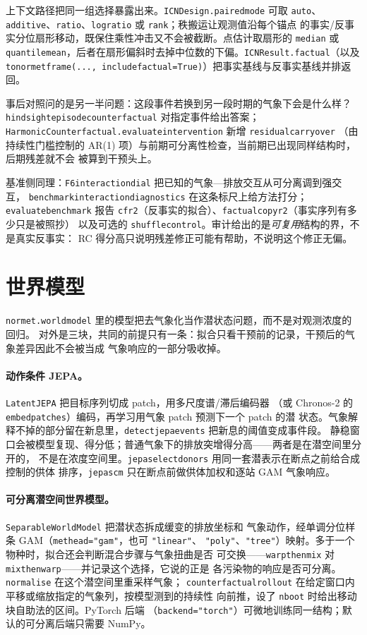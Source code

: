 \documentclass[11pt]{ctexrep}
\newcommand{\codeunderscore}{\textunderscore\allowbreak}
\newcommand{\code}[1]{\texttt{\let\_\codeunderscore #1}}
\begin{document}
上下文路径把同一组选择暴露出来。\code{ICNDesign.paired\_mode} 可取 \code{auto}、
\code{additive}、\code{ratio}、\code{log\_ratio} 或 \code{rank}；秩搬运让观测值沿每个锚点
的事实/反事实分位扇形移动，既保住乘性冲击又不会被截断。点估计取扇形的 \code{median} 或
\code{quantile\_mean}，后者在扇形偏斜时去掉中位数的下偏。\code{ICNResult.factual}（以及
\code{to\_normet\_frame(..., include\_factual=True)}）把事实基线与反事实基线并排返回。

事后对照问的是另一半问题：这段事件若换到另一段时期的气象下会是什么样？
\code{hindsight\_episode\_counterfactual} 对指定事件给出答案；
\code{HarmonicCounterfactual.evaluate\_intervention} 新增 \code{residual\_carryover}
（由持续性门槛控制的 AR(1) 项）与前期可分离性检查，当前期已出现同样结构时，后期残差就不会
被算到干预头上。

基准侧同理：\code{F6\_interaction\_dial} 把已知的气象—排放交互从可分离调到强交互，
\code{benchmark\_interaction\_diagnostics} 在这条标尺上给方法打分；\code{evaluate\_benchmark}
报告 \code{cf\_r2}（反事实的拟合）、\code{factual\_copy\_r2}（事实序列有多少只是被照抄）
以及可选的 \code{shuffle\_control}。审计给出的是\emph{可复用}结构的界，不是真实反事实：
RC 得分高只说明残差修正可能有帮助，不说明这个修正无偏。

\section{世界模型}\label{sec:worldmodeltheory}
\code{normet.world\_model} 里的模型把去气象化当作潜状态问题，而不是对观测浓度的回归。
对外是三块，共同的前提只有一条：拟合只看干预前的记录，干预后的气象差异因此不会被当成
气象响应的一部分吸收掉。

\paragraph{动作条件 JEPA。}\code{LatentJEPA} 把目标序列切成 patch，用多尺度谱/滞后编码器
（或 Chronos-2 的 \code{embed\_patches}）编码，再学习用气象 patch 预测下一个 patch 的潜
状态。气象解释不掉的部分留在新息里，\code{detect\_jepa\_events} 把新息的阈值变成事件段。
静稳窗口会被模型复现、得分低；普通气象下的排放突增得分高——两者是在潜空间里分开的，
不是在浓度空间里。\code{jepa\_select\_donors} 用同一套潜表示在断点之前给合成控制的供体
排序，\code{jepa\_scm} 只在断点前做供体加权和逐站 GAM 气象响应。

\paragraph{可分离潜空间世界模型。}\code{SeparableWorldModel} 把潜状态拆成缓变的排放坐标和
气象动作，经单调分位样条 GAM（\code{met\_head="gam"}，也可 \code{"linear"}、
\code{"poly"}、\code{"tree"}）映射。多于一个物种时，拟合还会判断混合步骤与气象扭曲是否
可交换——\code{warp\_then\_mix} 对 \code{mix\_then\_warp}——并记录这个选择，它说的正是
各污染物的响应是否可分离。\code{normalise} 在这个潜空间里重采样气象；
\code{counterfactual\_rollout} 在给定窗口内平移或缩放指定的气象列，按模型测到的持续性
向前推，设了 \code{n\_boot} 时给出移动块自助法的区间。PyTorch 后端
（\code{backend="torch"}）可微地训练同一结构；默认的可分离后端只需要 NumPy。
\end{document}
